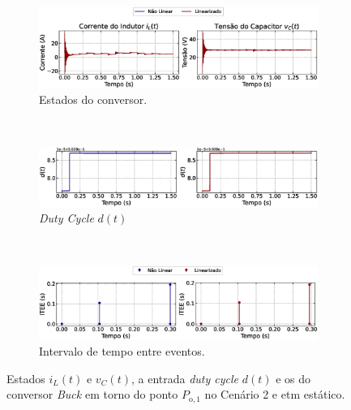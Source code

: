 \begin{figure}[H]
  \centering
  \captionsetup{justification=centering}
  \begin{subfigure}{1.\textwidth}
    \centering
    \includegraphics[width=1.\textwidth]{figuras/static-etm/buck/sim2/op1/result.eps}
    \caption{Estados do conversor.}
    \label{fig:buck_converter_variable_pcpl_static_etm_op1_duty_a}
  \end{subfigure}
  \\[6pt]
  \begin{subfigure}{1.\textwidth}
    \centering
    \includegraphics[width=1.\textwidth]{figuras/static-etm/buck/sim2/op1/duty-cycle.eps}
    \caption{\textit{Duty Cycle} $d(t)$}
    \label{fig:buck_converter_variable_pcpl_static_etm_op1_duty_b}
  \end{subfigure}
  \\[6pt]
  \begin{subfigure}{1.\textwidth}
    \centering
    \includegraphics[width=1.\textwidth]{figuras/static-etm/buck/sim2/op1/inter-event-times.eps}
    \caption{Intervalo de tempo entre eventos.}
    \label{fig:buck_converter_variable_pcpl_static_etm_op1_duty_c}
  \end{subfigure}
  \caption{Estados $i_L(t)$ e $v_C(t)$, a entrada \textit{duty cycle} $d(t)$ e os  do conversor \textit{Buck} em torno do ponto $P_{\mathrm{o}, 1}$ no Cenário 2 e \acrshort{etm} estático.}
\end{figure}

